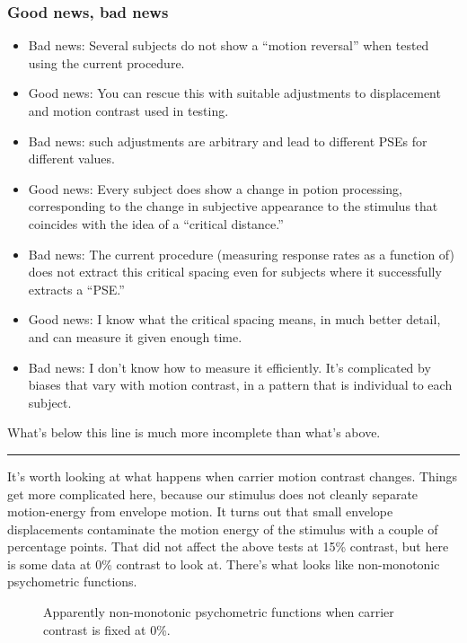 \documentclass[english,noae]{article}
\begin{document}
\subsubsection{Good news, bad news}
\begin{itemize}
\item Bad news: Several subjects do not show a ``motion reversal'' when
tested using the current procedure.
\item Good news: You can rescue this with suitable adjustments to displacement
and motion contrast used in testing.
\item Bad news: such adjustments are arbitrary and lead to different PSEs
for different values.
\item Good news: Every subject does show a change in potion processing,
corresponding to the change in subjective appearance to the stimulus
that coincides with the idea of a ``critical distance.''
\item Bad news: The current procedure (measuring response rates as a function
of) does not extract this critical spacing even for subjects where
it successfully extracts a ``PSE.''
\item Good news: I know what the critical spacing means, in much better
detail, and can measure it given enough time.
\item Bad news: I don't know how to measure it efficiently. It's complicated
by biases that vary with motion contrast, in a pattern that is individual
to each subject.
\end{itemize}
\bigskip{}


What's below this line is much more incomplete than what's above.

\rule[0.5ex]{1\columnwidth}{1pt}

It's worth looking at what happens when carrier motion contrast changes.
Things get more complicated here, because our stimulus does not cleanly
separate motion-energy from envelope motion. It turns out that small
envelope displacements contaminate the motion energy of the stimulus
with a couple of percentage points. That did not affect the above
tests at 15\% contrast, but here is some data at 0\% contrast to look
at. There's what looks like non-monotonic psychometric functions. 

\begin{figure}
\caption{Apparently non-monotonic psychometric functions when carrier contrast
is fixed at 0\%.}


\end{figure}
\end{document}
